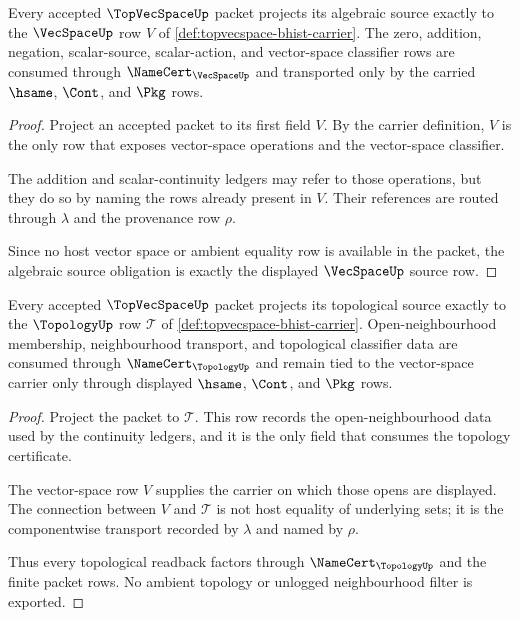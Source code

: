 \begin{theorem}
\label{thm:topvecspace-vecspace-source-obligation}
Every accepted $\TopVecSpaceUp$ packet projects its algebraic source exactly to the $\VecSpaceUp$ row $V$ of \autoref{def:topvecspace-bhist-carrier}. The zero, addition, negation, scalar-source, scalar-action, and vector-space classifier rows are consumed through $\NameCert_{\VecSpaceUp}$ and transported only by the carried $\hsame$, $\Cont$, and $\Pkg$ rows.
\end{theorem}
\begin{proof}
Project an accepted packet to its first field $V$. By the carrier definition, $V$ is the only row that exposes vector-space operations and the vector-space classifier.

The addition and scalar-continuity ledgers may refer to those operations, but they do so by naming the rows already present in $V$. Their references are routed through $\lambda$ and the provenance row $\rho$.

Since no host vector space or ambient equality row is available in the packet, the algebraic source obligation is exactly the displayed $\VecSpaceUp$ source row.
\end{proof}

\begin{theorem}
\label{thm:topvecspace-topology-source-obligation}
Every accepted $\TopVecSpaceUp$ packet projects its topological source exactly to the $\TopologyUp$ row $\mathcal T$ of \autoref{def:topvecspace-bhist-carrier}. Open-neighbourhood membership, neighbourhood transport, and topological classifier data are consumed through $\NameCert_{\TopologyUp}$ and remain tied to the vector-space carrier only through displayed $\hsame$, $\Cont$, and $\Pkg$ rows.
\end{theorem}
\begin{proof}
Project the packet to $\mathcal T$. This row records the open-neighbourhood data used by the continuity ledgers, and it is the only field that consumes the topology certificate.

The vector-space row $V$ supplies the carrier on which those opens are displayed. The connection between $V$ and $\mathcal T$ is not host equality of underlying sets; it is the componentwise transport recorded by $\lambda$ and named by $\rho$.

Thus every topological readback factors through $\NameCert_{\TopologyUp}$ and the finite packet rows. No ambient topology or unlogged neighbourhood filter is exported.
\end{proof}

